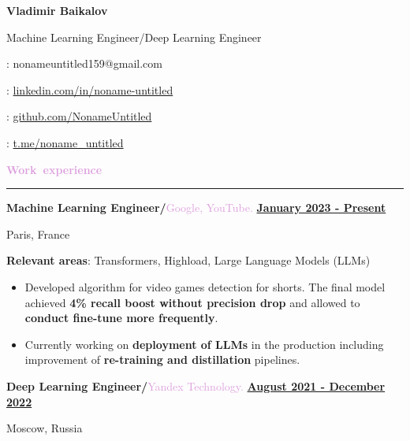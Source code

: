 \documentclass[10pt,a4paper]{report}
\author{Vladimir Baikalov}
\begin{document}
\noindent
\begin{minipage}[c]{0.66\linewidth}
\Huge{\textbf{Vladimir Baikalov}}

\small{Machine Learning Engineer/Deep Learning Engineer}
\end{minipage} %
\begin{minipage}[c]{0.33\linewidth}
\Letter: nonameuntitled159@gmail.com

\faLinkedin : \href{https://www.linkedin.com/in/noname-untitled}{linkedin.com/in/noname-untitled}

\faGithub:  \href{http://www.github.com/NonameUntitled}{github.com/NonameUntitled}

\faSend:  \href{http://www.t.me/noname\_untitled}{t.me/noname\_untitled}

\end{minipage}

\par\hbox{\Large{\textcolor{Plum}{\textbf{Work experience}}}}\kern3pt\hrule\kern5pt

\textbf{\large{Machine Learning Engineer/}}\textcolor{Plum}{Google, YouTube.}
\hfill
\textbf {\underline{January 2023 - Present}}

Paris, France

\textbf{Relevant areas}: Transformers, Highload, Large Language Models (LLMs)

\begin{itemize}[label={}, left=10pt]
    \item  Developed algorithm for video games detection for shorts. The final model achieved \textbf{4\% recall boost without precision drop} and allowed to \textbf{conduct fine-tune more frequently}.

    \item Currently working on \textbf{deployment of LLMs} in the production including improvement of \textbf{re-training and distillation} pipelines. 

\end{itemize}

\vspace{2mm}

\textbf{\large{Deep Learning Engineer/}}\textcolor{Plum}{Yandex Technology.}
\hfill
\textbf {\underline{August 2021 - December 2022}}

Moscow, Russia
\end{document}
